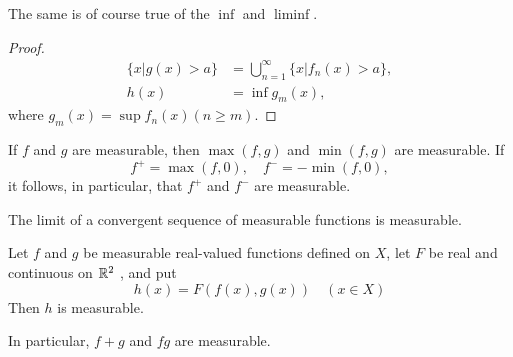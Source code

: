 The same is of course true of the $\inf$ and $\liminf$.

\begin{proof}
    \begin{align*}
        \{x | g(x) > a\} &= \bigcup_{n=1}^{\infty} \{x | f_n(x) > a\} , \\
        h(x) &= \inf g_m (x),
    \end{align*}
    where $g_m (x) = \sup f_n (x) (n \geq m)$.
\end{proof}

\begin{myCorollary*}
    \begin{asparaenum} [(a)]
        \item If $f$ and $g$ are measurable, then $\max(f, g)$ and $\min(f, g)$ are measurable. 
        If
        \begin{equation}
            \label{eq:11.47}
            f^+ =  \max (f, 0), \quad
            f^- = -\min (f, 0),
        \end{equation}
        it follows, in particular, that $f^+$ and $f^-$ are measurable.
        \item The limit of a convergent sequence of measurable functions is measurable.
    \end{asparaenum}
\end{myCorollary*}

\begin{thm}
    \label{thm:11.18}
    Let $f$ and $g$ be measurable real-valued functions defined on $X$,
    let $F$ be real and continuous on ${\protect\mathbb R}^2$ , and put
    \begin{equation*}
        h(x) = F(f (x), g(x))
        \quad (x \in X)
    \end{equation*}
    Then $h$ is measurable.

    In particular, $f + g$ and $fg$ are measurable.
\end{thm}

